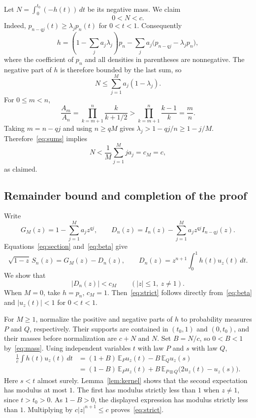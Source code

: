 \documentclass[11pt]{article}
\begin{document}
Let $N=\int_0^{t_0}(-h(t))\,dt$ be its negative mass. We claim
\begin{equation}
 0<N<c. \label{eq:mass}
\end{equation}
Indeed, $p_{n-qj}(t)\geq\lambda_j p_n(t)$ for $0<t<1$.
Consequently
\[
 h=\left(1-\sum_j a_j\lambda_j\right)p_n
          -\sum_j a_j\bigl(p_{n-qj}-\lambda_jp_n\bigr),
\]
where the coefficient of $p_n$ and all densities in parentheses are
nonnegative. The negative part of $h$ is therefore bounded by the last sum,
so
\[
 N\leq \sum_{j=1}^M a_j(1-\lambda_j).
\]
For $0\leq m<n$,
\[
 \frac{A_m}{A_n}
 =\prod_{k=m+1}^n\frac{k}{k+1/2}
 >\prod_{k=m+1}^n\frac{k-1}{k}=\frac mn.
\]
Taking $m=n-qj$ and using $n\geq qM$ gives
$\lambda_j>1-qj/n\geq1-j/M$. Therefore~\eqref{eq:sums} implies
\[
 N<\frac1M\sum_{j=1}^M ja_j=c_M=c,
\]
as claimed.

\subsection*{Remainder bound and completion of the proof}

Write
\[
 G_M(z)=1-\sum_{j=1}^M a_jz^{qj},\qquad
 D_n(z)=I_n(z)-\sum_{j=1}^M a_jz^{qj}I_{n-qj}(z).
\]
Equations~\eqref{eq:section} and~\eqref{eq:beta} give
\begin{equation}
 \sqrt{1-z}\,S_n(z)=G_M(z)-D_n(z),\qquad
 D_n(z)=z^{n+1}\int_0^1 h(t)u_z(t)\,dt. \label{eq:remainder}
\end{equation}
We show that
\begin{equation}
 |D_n(z)|<c_M\qquad (|z|\leq1,\ z\ne1). \label{eq:strict}
\end{equation}
When $M=0$, take $h=p_n$, $c_M=1$. Then~\eqref{eq:strict} follows
directly from~\eqref{eq:beta} and $|u_z(t)|<1$ for $0<t<1$.

For $M\geq1$, normalize the positive and negative parts of $h$ to
probability measures $P$ and $Q$, respectively. Their supports are contained
in $(t_0,1)$ and $(0,t_0)$, and their masses before normalization are
$c+N$ and $N$. Set $B=N/c$, so $0<B<1$ by~\eqref{eq:mass}.
Using independent variables $t$ with law $P$ and $s$ with law $Q$,
\begin{align*}
 \frac1c\int h(t)u_z(t)\,dt
  &=(1+B)\,\mathbb E_Pu_z(t)-B\,\mathbb E_Qu_z(s)\\
  &=(1-B)\,\mathbb E_Pu_z(t)
       +B\,\mathbb E_{P\otimes Q}\bigl(2u_z(t)-u_z(s)\bigr).
\end{align*}
Here $s<t$ almost surely. Lemma~\ref{lem:kernel} shows that the second
expectation has modulus at most $1$. The first has modulus strictly
less than $1$ when $z\ne1$, since $t>t_0>0$.
As $1-B>0$, the displayed expression has modulus strictly less than $1$.
Multiplying by $c|z|^{n+1}\leq c$ proves~\eqref{eq:strict}.
\end{document}
